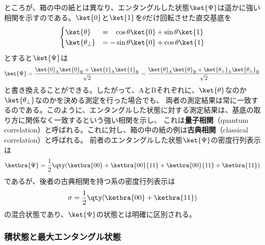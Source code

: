 \documentclass[a4paper,11pt,uplatex]{jsarticle}%
\begin{document}
ところが、箱の中の紙とは異なり、エンタングルした状態$\ket{\Psi}$は遥かに強い相関を示すのである。$\ket{0}$と$\ket{1}$を$\theta$だけ回転させた直交基底を
\begin{equation}
  \begin{cases}
    \ket{\theta}         & = \;\;\;\cos\theta\ket{0} + \sin\theta\ket{1} \\
    \ket{\theta_{\perp}} & = -\sin\theta\ket{0} + \cos\theta\ket{1}
  \end{cases}
\end{equation}
とすると$\ket{\Psi}$は
\begin{equation}
  \ket{\Psi} = \frac{\ket{0}_{\text{A}}\ket{0}_{\text{B}} + \ket{1}_{\text{A}}\ket{1}_{\text{B}}}{\sqrt{2}} 
             = \frac{\ket{\theta}_{\text{A}}\ket{\theta}_{\text{B}} + \ket{\theta_{\perp}}_{\text{A}}\ket{\theta_{\perp}}_{\text{B}}}{\sqrt{2}}
             \label{eq:entangled_unitary}
\end{equation}
と書き換えることができる。したがって、AとBそれぞれに、$\ket{\theta}$なのか$\ket{\theta_{\perp}}$なのかを決める測定を行った場合でも、
両者の測定結果は常に一致するのである。このように、エンタングルした状態に対する測定結果は、基底の取り方に関係なく一致するという強い相関を示し、
これは\textbf{量子相関}（quantum correlation）と呼ばれる。これに対し、箱の中の紙の例は\textbf{古典相関}（classical correlation）と呼ばれる。
前者のエンタングルした状態$\ket{\Psi}$の密度行列表示は
\begin{equation}
  \ketbra{\Psi} = \frac{1}{2}\qty(\ketbra{00} + \ketbra{00}{11} + \ketbra{00}{11} + \ketbra{11})
\end{equation}
であるが、後者の古典相関を持つ系の密度行列表示は
\begin{equation}
  \sigma = \frac{1}{2}\qty(\ketbra{00} + \ketbra{11})
\end{equation}
の混合状態であり、$\ket{\Psi}$の状態とは明確に区別される。

\subsubsection{積状態と最大エンタングル状態}
\end{document}

